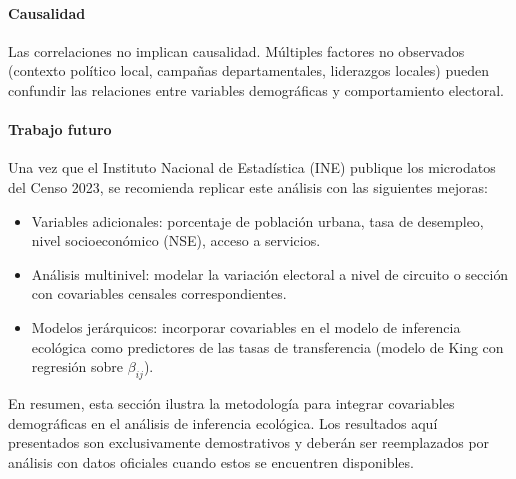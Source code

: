 \paragraph{Causalidad}
Las correlaciones no implican causalidad. Múltiples factores no observados (contexto político local, campañas departamentales, liderazgos locales) pueden confundir las relaciones entre variables demográficas y comportamiento electoral.

\paragraph{Trabajo futuro}
Una vez que el Instituto Nacional de Estadística (INE) publique los microdatos del Censo 2023, se recomienda replicar este análisis con las siguientes mejoras:

\begin{itemize}
    \item Variables adicionales: porcentaje de población urbana, tasa de desempleo, nivel socioeconómico (NSE), acceso a servicios.
    \item Análisis multinivel: modelar la variación electoral a nivel de circuito o sección con covariables censales correspondientes.
    \item Modelos jerárquicos: incorporar covariables en el modelo de inferencia ecológica como predictores de las tasas de transferencia (modelo de King con regresión sobre $\beta_{ij}$).
\end{itemize}

En resumen, esta sección ilustra la metodología para integrar covariables demográficas en el análisis de inferencia ecológica. Los resultados aquí presentados son exclusivamente demostrativos y deberán ser reemplazados por análisis con datos oficiales cuando estos se encuentren disponibles.
